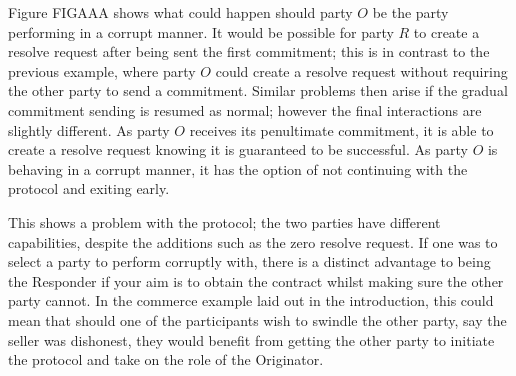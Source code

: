 \documentclass{l4proj}
\begin{document}
Figure FIGAAA shows what could happen should party $O$ be the party performing in a corrupt manner. 
It would be possible for party $R$ to create a resolve request after being sent the first commitment; this is in contrast to the previous example, where party $O$ could create a resolve request without requiring the other party to send a commitment. Similar problems then arise if the gradual commitment sending is resumed as normal; however the final interactions are slightly different. As party $O$ receives its penultimate commitment, it is able to create a resolve request knowing it is guaranteed to be successful. As party $O$ is behaving in a corrupt manner, it has the option of not continuing with the protocol and exiting early.

This shows a problem with the protocol; the two parties have different capabilities, despite the additions such as the zero resolve request. If one was to select a party to perform corruptly with, there is a distinct advantage to being the Responder if your aim is to obtain the contract whilst making sure the other party cannot. In the commerce example laid out in the introduction, this could mean that should one of the participants wish to swindle the other party, say the seller was dishonest, they would benefit from getting the other party to initiate the protocol and take on the role of the Originator.




\end{document}

